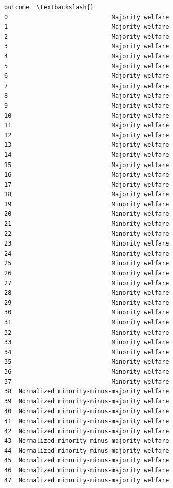 \documentclass[11pt]{article}
\makeatletter
\newcommand{\boxspacing}{\kern\kvtcb@left@rule\kern\kvtcb@boxsep}
\newcommand{\prompt}[4]{
        {\ttfamily\llap{{\color{#2}[#3]:\hspace{3pt}#4}}\vspace{-\baselineskip}}
    }
\makeatother
\begin{document}
    
            \begin{tcolorbox}[breakable, size=fbox, boxrule=.5pt, pad at break*=1mm, opacityfill=0]
\prompt{Out}{outcolor}{112}{\boxspacing}
\begin{Verbatim}[commandchars=\\\{\}]
                                       outcome  \textbackslash{}
0                             Majority welfare
1                             Majority welfare
2                             Majority welfare
3                             Majority welfare
4                             Majority welfare
5                             Majority welfare
6                             Majority welfare
7                             Majority welfare
8                             Majority welfare
9                             Majority welfare
10                            Majority welfare
11                            Majority welfare
12                            Majority welfare
13                            Majority welfare
14                            Majority welfare
15                            Majority welfare
16                            Majority welfare
17                            Majority welfare
18                            Majority welfare
19                            Minority welfare
20                            Minority welfare
21                            Minority welfare
22                            Minority welfare
23                            Minority welfare
24                            Minority welfare
25                            Minority welfare
26                            Minority welfare
27                            Minority welfare
28                            Minority welfare
29                            Minority welfare
30                            Minority welfare
31                            Minority welfare
32                            Minority welfare
33                            Minority welfare
34                            Minority welfare
35                            Minority welfare
36                            Minority welfare
37                            Minority welfare
38  Normalized minority-minus-majority welfare
39  Normalized minority-minus-majority welfare
40  Normalized minority-minus-majority welfare
41  Normalized minority-minus-majority welfare
42  Normalized minority-minus-majority welfare
43  Normalized minority-minus-majority welfare
44  Normalized minority-minus-majority welfare
45  Normalized minority-minus-majority welfare
46  Normalized minority-minus-majority welfare
47  Normalized minority-minus-majority welfare

\end{Verbatim}
\end{tcolorbox}
\end{document}
